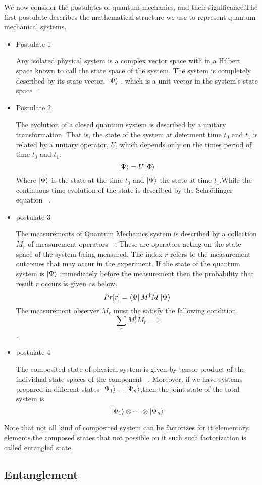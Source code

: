 We now consider the postulates of quantum mechanics, and their significance.The first postulate describes the mathematical structure we use to represent quantum mechanical systems.
\begin{itemize}
\item {Postulate 1}

Any isolated physical system is a complex vector space with in a Hilbert space known to call the state space of the system. The system is completely described by its state vector, $\ket{\Psi}$ , which is a unit vector in the system’s state space~\cite{book:17312}.
\item{Postulate 2}

The evolution of a closed quantum system is described by a unitary transformation. That is, the state of the system at deferment time $t_0$ and $t_1$ is related by a unitary operator, $U$, which depends only on the times period of time $t_0$ and $t_1$:
$$\ket{\Psi}=U\ket{\Phi}$$
Where $\ket{\Phi}$ is the state at the time $t_0$ and $\ket{\Psi}$ the state at time $t_1$.While the continuous time evolution of the state is described by the Schrödinger equation ~\cite{book:17312}.
\item{postulate 3}

The measurements of Quantum Mechanics system is described by a collection ${M_r }$ of measurement operators~\citep{book:17312}~. These are operators acting on the state space of the system being
measured. The index $r $ refers to the measurement outcomes that may occur in the experiment. If the state of the quantum system is $\ket{\Psi}$ immediately before the measurement then the probability that result $r$ occurs is given as below.
$$Pr[r]=\bra{\Psi}M^{\dagger} M\ket{\Psi}$$ 
The measurement observer ${M_r }$ must the satisfy the fallowing condition.
$$\sum_r M_{r}^{\dagger} M_r=1$$.


\item{postulate 4}

The composited state of physical system is given by tensor product of the individual state spaces of the component~\citep{book:889079} . Moreover, if we have systems prepared in different states $\ket{\Psi_1} \dots \ket{\Psi_n}$,then the joint state of the total system is
$$\ket{\Psi_1}\otimes\dots \otimes\ket{\Psi_n}$$
\end{itemize}
Note that not all kind of composited system can be factorizes for it elementary elements,the composed states that not possible on it such such factorization is called entangled state.
\subsection{Entanglement}

